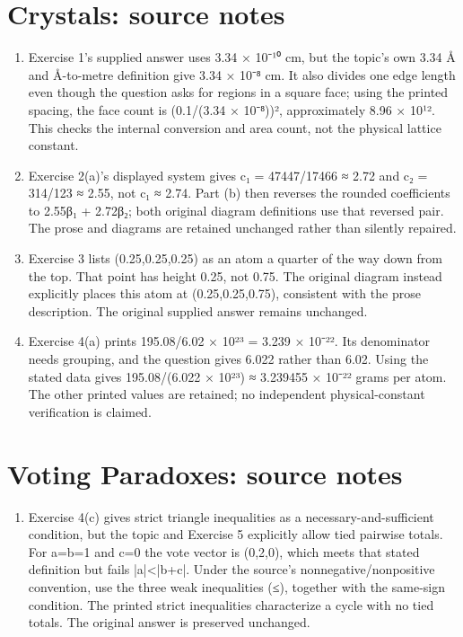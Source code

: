 \section*{Crystals: source notes}
\begin{enumerate}
\item Exercise 1’s supplied answer uses 3.34 × 10⁻¹⁰ cm, but the topic’s own 3.34 Å and Å-to-metre definition give 3.34 × 10⁻⁸ cm. It also divides one edge length even though the question asks for regions in a square face; using the printed spacing, the face count is (0.1/(3.34 × 10⁻⁸))², approximately 8.96 × 10¹². This checks the internal conversion and area count, not the physical lattice constant.
\item Exercise 2(a)’s displayed system gives c₁ = 47447/17466 ≈ 2.72 and c₂ = 314/123 ≈ 2.55, not c₁ ≈ 2.74. Part (b) then reverses the rounded coefficients to 2.55β₁ + 2.72β₂; both original diagram definitions use that reversed pair. The prose and diagrams are retained unchanged rather than silently repaired.
\item Exercise 3 lists (0.25,0.25,0.25) as an atom a quarter of the way down from the top. That point has height 0.25, not 0.75. The original diagram instead explicitly places this atom at (0.25,0.25,0.75), consistent with the prose description. The original supplied answer remains unchanged.
\item Exercise 4(a) prints 195.08/6.02 × 10²³ = 3.239 × 10⁻²². Its denominator needs grouping, and the question gives 6.022 rather than 6.02. Using the stated data gives 195.08/(6.022 × 10²³) ≈ 3.239455 × 10⁻²² grams per atom. The other printed values are retained; no independent physical-constant verification is claimed.
\end{enumerate}
\section*{Voting Paradoxes: source notes}
\begin{enumerate}
\item Exercise 4(c) gives strict triangle inequalities as a necessary-and-sufficient condition, but the topic and Exercise 5 explicitly allow tied pairwise totals. For a=b=1 and c=0 the vote vector is (0,2,0), which meets that stated definition but fails |a|<|b+c|. Under the source’s nonnegative/nonpositive convention, use the three weak inequalities (≤), together with the same-sign condition. The printed strict inequalities characterize a cycle with no tied totals. The original answer is preserved unchanged.
\end{enumerate}
